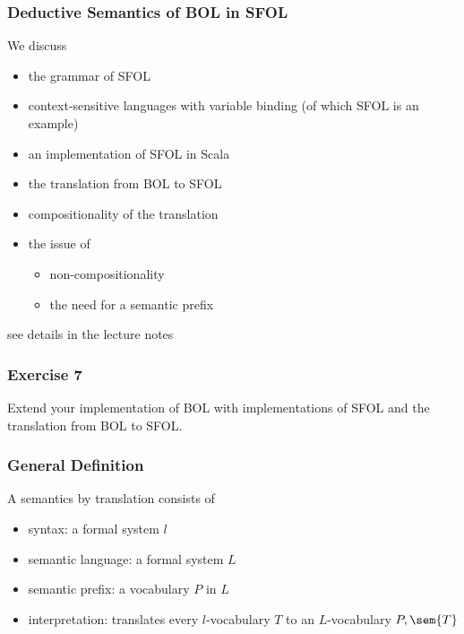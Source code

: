 \begin{frame}\frametitle{Deductive Semantics of BOL in SFOL}
We discuss
\begin{itemize}
\item the grammar of SFOL
\item context-sensitive languages with variable binding (of which SFOL is an example)
\item an implementation of SFOL in Scala
\item the translation from BOL to SFOL
\item compositionality of the translation
\item the issue of
 \begin{itemize}
 \item non-compositionality
 \item the need for a semantic prefix
 \end{itemize}
\end{itemize}
see details in the lecture notes
\end{frame}

\begin{frame}\frametitle{Exercise 7}
Extend your implementation of BOL with implementations of SFOL and the translation from BOL to SFOL.
\end{frame}

\begin{frame}\frametitle{General Definition}
A semantics by translation consists of
\begin{itemize}
 \item syntax: a formal system $l$
 \item semantic language: a formal system $L$
 \item semantic prefix: a vocabulary $P$ in $L$
 \item interpretation: translates every $l$-vocabulary $T$ to an $L$-vocabulary $P,\sem{T}$
\end{itemize}
\end{frame}

